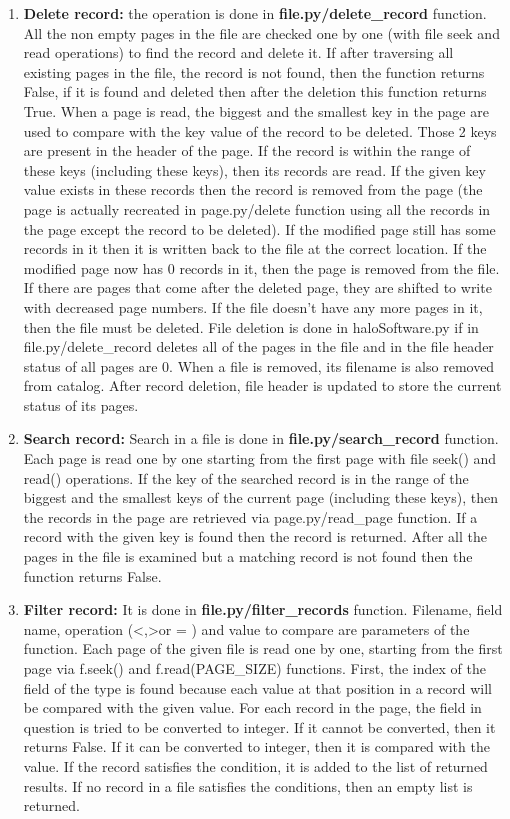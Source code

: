 \documentclass{article}
\begin{document}
\begin{enumerate}
    \item \textbf{Delete record:} the operation is done in \textbf{file.py\slash delete\_record} function. All the non empty pages in the file are checked one by one (with file seek and read operations) to find the record and delete it. If after traversing all existing pages in the file, the record is not found, then the function returns False, if it is found and deleted then after the deletion this function returns True. When a page is read, the biggest and the smallest key in the page are used to compare with the key value of the record to be deleted. Those 2 keys are present in the header of the page. If the record is within the range of these keys (including these keys), then its records are read. If the given key value exists in these records then the record is removed from the page (the page is actually recreated in page.py\slash delete function using all the records in the page except the record to be deleted). If the modified page still has some records in it then it is written back to the file at the correct location. If the modified page now has 0 records in it, then the page is removed from the file. If there are pages that come after the deleted page, they are shifted to write with decreased page numbers. If the file doesn't have any more pages in it, then the file must be deleted. File deletion is done in haloSoftware.py if in file.py\slash delete\_record deletes all of the pages in the file and in the file header status of all pages are 0. When a file is removed, its filename is also removed from catalog. After record deletion, file header is updated to store the current status of its pages. 
    \item \textbf{Search record:} Search in a file is done in \textbf{file.py\slash search\_record} function. Each page is read one by one starting from the first page with file seek() and read() operations. If the key of the searched record is in the range of the biggest and the smallest keys of the current page (including these keys), then the records in the page are retrieved via page.py\slash read\_page function. If a record with the given key is found then the record is returned. After all the pages in the file is examined but a matching record is not found then the function returns False.
    \item \textbf{Filter record:} It is done in \textbf{file.py\slash filter\_records} function. Filename, field name, operation (\textless,\textgreater or = ) and value to compare are parameters of the function. Each page of the given file is read one by one, starting from the first page via f.seek() and f.read(PAGE\_SIZE) functions. First, the index of the field of the type is found because each value at that position in a record will be compared with the given value. For each record in the page, the field in question is tried to be converted to integer. If it cannot be converted, then it returns False. If it can be converted to integer, then it is compared with the value. If the record satisfies the condition, it is added to the list of returned results. If no record in a file satisfies the conditions, then an empty list is returned. 

\end{enumerate}
\end{document}
